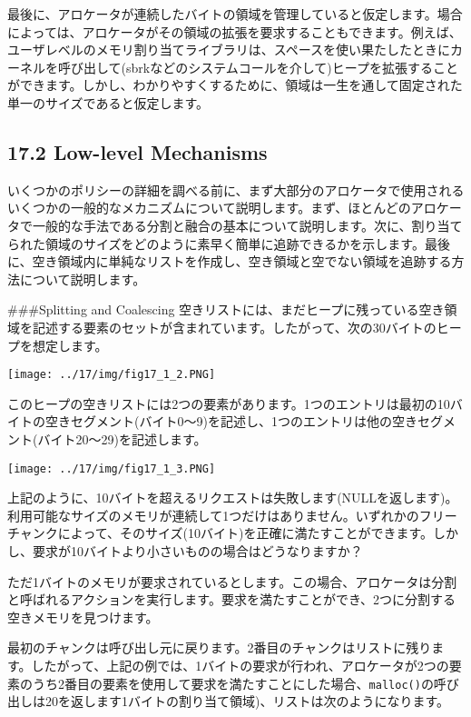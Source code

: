 最後に、アロケータが連続したバイトの領域を管理していると仮定します。場合によっては、アロケータがその領域の拡張を要求することもできます。例えば、ユーザレベルのメモリ割り当てライブラリは、スペースを使い果たしたときにカーネルを呼び出して(sbrkなどのシステムコールを介して)ヒープを拡張することができます。しかし、わかりやすくするために、領域は一生を通して固定された単一のサイズであると仮定します。

\hypertarget{low-level-mechanisms}{%
\subsection*{17.2 Low-level Mechanisms}\label{low-level-mechanisms}}

いくつかのポリシーの詳細を調べる前に、まず大部分のアロケータで使用されるいくつかの一般的なメカニズムについて説明します。まず、ほとんどのアロケータで一般的な手法である分割と融合の基本について説明します。次に、割り当てられた領域のサイズをどのように素早く簡単に追跡できるかを示します。最後に、空き領域内に単純なリストを作成し、空き領域と空でない領域を追跡する方法について説明します。

\#\#\#Splitting and Coalescing
空きリストには、まだヒープに残っている空き領域を記述する要素のセットが含まれています。したがって、次の30バイトのヒープを想定します。

\texttt{[image: ../17/img/fig17\_1\_2.PNG]}

このヒープの空きリストには2つの要素があります。1つのエントリは最初の10バイトの空きセグメント(バイト0〜9)を記述し、1つのエントリは他の空きセグメント(バイト20〜29)を記述します。

\texttt{[image: ../17/img/fig17\_1\_3.PNG]}

上記のように、10バイトを超えるリクエストは失敗します(NULLを返します)。利用可能なサイズのメモリが連続して1つだけはありません。いずれかのフリーチャンクによって、そのサイズ(10バイト)を正確に満たすことができます。しかし、要求が10バイトより小さいものの場合はどうなりますか？

ただ1バイトのメモリが要求されているとします。この場合、アロケータは分割と呼ばれるアクションを実行します。要求を満たすことができ、2つに分割する空きメモリを見つけます。

最初のチャンクは呼び出し元に戻ります。2番目のチャンクはリストに残ります。したがって、上記の例では、1バイトの要求が行われ、アロケータが2つの要素のうち2番目の要素を使用して要求を満たすことにした場合、\texttt{malloc()}の呼び出しは20を返します1バイトの割り当て領域)、リストは次のようになります。

